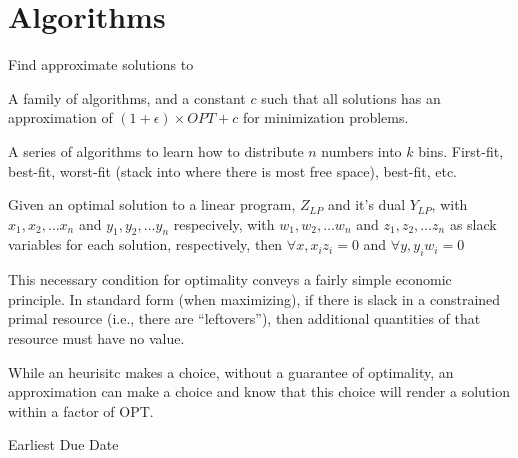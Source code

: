 \section{Algorithms}\label{section:word}

\begin{definition}
    Find approximate solutions to~
\end{definition}


\begin{definition}
\label{APTAS}
    A family of algorithms, and a constant $c$ such that all solutions has an
    approximation of $(1 + \epsilon)\times{OPT} + c$ for minimization problems.
\end{definition}


\begin{definition}
    A series of algorithms to learn how to distribute $n$ numbers into $k$ bins.
    First-fit, best-fit, worst-fit (stack into where there is most free space),
    best-fit, etc.
\end{definition}

\begin{definition}
    Given an optimal solution to a linear program,
    $Z_{LP}$ and it's dual $Y_{LP}$, with $x_{1}, x_{2}, \dots x_{n}$ and
    $y_{1}, y_{2}, \dots y_{n}$ respecively, with
    $w_{1}, w_{2}, \dots w_{n}$ and $z_{1}, z_{2}, \dots z_{n}$  as slack
    variables for each solution, respectively,
    then $\forall x, x_{i}z_{i} = 0$ and $\forall y, y_{i} w_{i} = 0$

    This necessary condition for optimality conveys a fairly simple economic
    principle.  In standard form (when maximizing), if there is slack in a
    constrained primal resource (i.e., there are ``leftovers''),
    then additional quantities of that resource must have no value. 
\end{definition}

\begin{definition}
    While an heurisitc makes a choice, without a guarantee of optimality,
    an approximation can make a choice and know that this choice will render
    a solution within a factor of OPT.\
\end{definition}

\begin{definition}[EDD]\label{EDD}
    Earliest Due Date
\end{definition}

